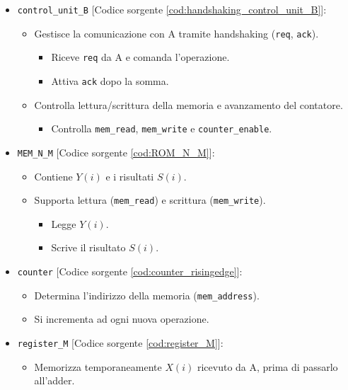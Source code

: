 \begin{itemize}
    \item \texttt{control\_unit\_B} [Codice sorgente \ref{cod:handshaking_control_unit_B}]:
    \begin{itemize}
        \item Gestisce la comunicazione con A tramite handshaking (\texttt{req}, \texttt{ack}).
        \begin{itemize}
            \item Riceve \texttt{req} da A e comanda l'operazione.
            \item Attiva \texttt{ack} dopo la somma.
        \end{itemize}
        \item Controlla lettura/scrittura della memoria e avanzamento del contatore.
        \begin{itemize}
            \item Controlla \texttt{mem\_read}, \texttt{mem\_write} e \texttt{counter\_enable}.
        \end{itemize}
    \end{itemize}
    \item \texttt{MEM\_N\_M} [Codice sorgente \ref{cod:ROM_N_M}]:
    \begin{itemize}
        \item Contiene $Y(i)$ e i risultati $S(i)$.
        \item Supporta lettura (\texttt{mem\_read}) e scrittura (\texttt{mem\_write}).
        \begin{itemize}
            \item Legge $Y(i)$.
            \item Scrive il risultato $S(i)$.
        \end{itemize}
    \end{itemize}
    \item \texttt{counter} [Codice sorgente \ref{cod:counter_risingedge}]:
    \begin{itemize}
        \item Determina l'indirizzo della memoria (\texttt{mem\_address}).
        \item Si incrementa ad ogni nuova operazione.
    \end{itemize}
    \item \texttt{register\_M} [Codice sorgente \ref{cod:register_M}]:
    \begin{itemize}
        \item Memorizza temporaneamente $X(i)$ ricevuto da A, prima di passarlo all’adder.

\end{itemize}
\end{itemize}

